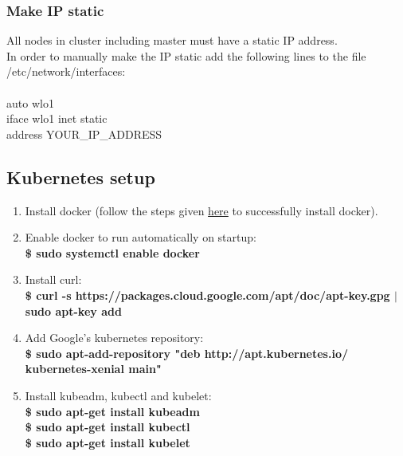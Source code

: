 \documentclass[12pt]{article}
\begin{document}
\subsubsection{Make IP static}
All nodes in cluster including master must have a static IP address.\\
In order to manually make the IP static add the following lines to the file /etc/network/interfaces:\\\\
auto wlo1\\
iface wlo1 inet static\\
address  YOUR\_IP\_ADDRESS
\subsection{Kubernetes setup}
\begin{enumerate}
	\item Install docker (follow the steps given \hyperref[sec:dockerinstall]{here} to successfully install docker).
	\item Enable docker to run automatically on startup:\\
	\textbf{\$ sudo systemctl enable docker}
	\item Install curl:\\
	\textbf{\$ curl -s https://packages.cloud.google.com/apt/doc/apt-key.gpg $\vert$ sudo apt-key add}
	\item Add Google’s kubernetes repository:\\
	\textbf{\$ sudo apt-add-repository "deb http://apt.kubernetes.io/ kubernetes-xenial main"}
	\item Install kubeadm, kubectl and kubelet:\\
	\textbf{\$ sudo apt-get install kubeadm}\\
	\textbf{\$ sudo apt-get install kubectl}\\
	\textbf{\$ sudo apt-get install kubelet}
\end{enumerate}
\end{document}
